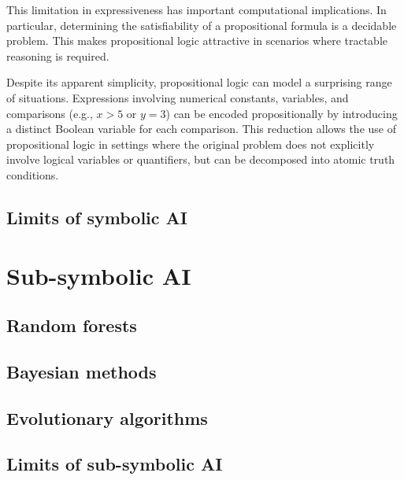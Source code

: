 This limitation in expressiveness has important computational implications.  
%
In particular, determining the satisfiability of a propositional formula is a decidable problem.  
%
This makes propositional logic attractive in scenarios where tractable reasoning is required.

Despite its apparent simplicity, propositional logic can model a surprising range of situations.  
%
Expressions involving numerical constants, variables, and comparisons (e.g., $x > 5$ or $y = 3$) can be encoded propositionally by introducing a distinct Boolean variable for each comparison.  
%
This reduction allows the use of propositional logic in settings where the original problem does not explicitly involve logical variables or quantifiers, but can be decomposed into atomic truth conditions.


\subsection{Limits of symbolic \Gls{AI}}\label{subsec:limits-of-symbolic-ai}
%



\section{Sub-symbolic \Gls{AI}}\label{sec:sub-symbolic-ai}

\subsection{Random forests}\label{subsec:random-forests}

\subsection{Bayesian methods}\label{subsec:bayesian-methods}

\subsection{Evolutionary algorithms}\label{subsec:evolutionary-algorithms}

\subsection{}\label{subsec:svm}

\subsection{}\label{subsec:neural-networks}

\subsection{Limits of sub-symbolic \Gls{AI}}\label{subsec:limits-of-sub-symbolic-ai}